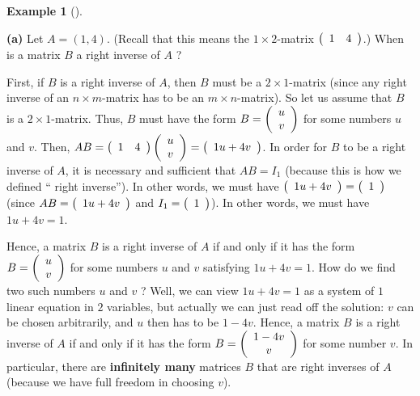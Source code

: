 \documentclass[numbers=enddot,12pt,final,onecolumn,notitlepage]{scrartcl}%
\theoremstyle{definition}
\newtheorem{exam}[theo]{Example}
\newenvironment{example}[1][]
{\begin{exam}[#1]\begin{leftbar}}
{\end{leftbar}\end{exam}}
\begin{document}
\begin{example}
\label{exam.inverses}\textbf{(a)} Let $A=\left(  1,4\right)  $. (Recall that
this means the $1\times2$-matrix $\left(
\begin{array}
[c]{cc}%
1 & 4
\end{array}
\right)  $.) When is a matrix $B$ a right inverse of $A$ ?

First, if $B$ is a right inverse of $A$, then $B$ must be a $2\times1$-matrix
(since any right inverse of an $n\times m$-matrix has to be an $m\times
n$-matrix). So let us assume that $B$ is a $2\times1$-matrix. Thus, $B$ must
have the form $B=\left(
\begin{array}
[c]{c}%
u\\
v
\end{array}
\right)  $ for some numbers $u$ and $v$. Then, $AB=\left(
\begin{array}
[c]{cc}%
1 & 4
\end{array}
\right)  \left(
\begin{array}
[c]{c}%
u\\
v
\end{array}
\right)  =\left(
\begin{array}
[c]{c}%
1u+4v
\end{array}
\right)  $. In order for $B$ to be a right inverse of $A$, it is necessary and
sufficient that $AB=I_{1}$ (because this is how we defined \textquotedblleft
right inverse\textquotedblright). In other words, we must have $\left(
\begin{array}
[c]{c}%
1u+4v
\end{array}
\right)  =\left(
\begin{array}
[c]{c}%
1
\end{array}
\right)  $ (since $AB=\left(
\begin{array}
[c]{c}%
1u+4v
\end{array}
\right)  $ and $I_{1}=\left(
\begin{array}
[c]{c}%
1
\end{array}
\right)  $). In other words, we must have $1u+4v=1$.

Hence, a matrix $B$ is a right inverse of $A$ if and only if it has the form
$B=\left(
\begin{array}
[c]{c}%
u\\
v
\end{array}
\right)  $ for some numbers $u$ and $v$ satisfying $1u+4v=1$. How do we find
two such numbers $u$ and $v$ ? Well, we can view $1u+4v=1$ as a system of $1$
linear equation in $2$ variables, but actually we can just read off the
solution: $v$ can be chosen arbitrarily, and $u$ then has to be $1-4v$. Hence,
a matrix $B$ is a right inverse of $A$ if and only if it has the form
$B=\left(
\begin{array}
[c]{c}%
1-4v\\
v
\end{array}
\right)  $ for some number $v$. In particular, there are \textbf{infinitely
many} matrices $B$ that are right inverses of $A$ (because we have full
freedom in choosing $v$).


\end{example}
\end{document}
